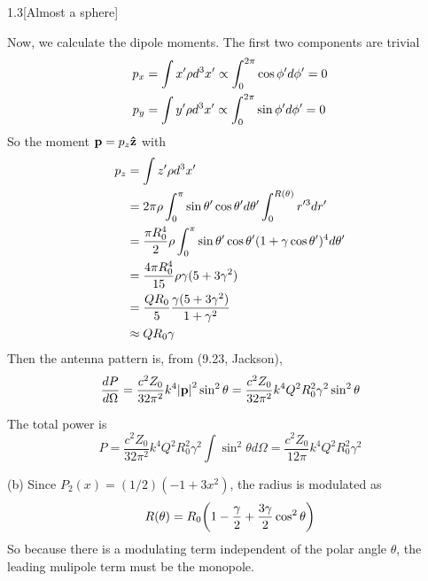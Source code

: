 \documentclass[12pt]{article}
\begin{document}
\begin{problem}{1.3}[Almost a sphere]
\begin{solution}
Now, we calculate the dipole moments. The first two components are trivial
\begin{align}
    p_x&=\int x'\rho d^3x'\propto\int_0^{2\pi}\cos\phi'd\phi'=0\notag\\
    p_y&=\int y'\rho d^3x'\propto\int_0^{2\pi}\sin\phi'd\phi'=0
\end{align}
So the moment $\vb{p}=p_z\vb{\hat{z}}$ with
\begin{align}
    p_z&=\int z'\rho d^3x'\notag\\
       &=2\pi\rho\int_0^\pi\sin\theta'\cos\theta'd\theta'
        \int_0^{R(\theta)}r'^3dr'\notag\\
       &=\frac{\pi
       R_0^4}{2}\rho\int_0^{\pi}\sin\theta'\cos\theta'(1+\gamma\cos\theta')^4d\theta'\notag\\
       &=\frac{4\pi R_0^4}{15}\rho\gamma(5+3\gamma^2)\notag\\
       &=\frac{QR_0}{5}\frac{\gamma(5+3\gamma^2)}{1+\gamma^2}\notag\\
       &\approx QR_0\gamma
\end{align}
Then the antenna pattern is, from (9.23, Jackson),
\begin{equation}
    \frac{dP}{d\Omega}=\frac{c^2Z_0}{32\pi^2}k^4\abs{\vb{p}}^2\sin^2\theta
    =\frac{c^2Z_0}{32\pi^2}k^4Q^2R_0^2\gamma^2\sin^2\theta
\end{equation}

The total power is
\begin{equation}
    P=\frac{c^2Z_0}{32\pi^2}k^4Q^2R_0^2\gamma^2\int\sin^2\theta d\Omega 
    =\frac{c^2Z_0}{12\pi}k^4Q^2R_0^2\gamma^2
\end{equation}

(b) Since $P_2(x)=(1/2)(-1+3x^2)$, the radius is modulated as
\begin{equation}
    R(\theta)=R_0\qty(1-\frac{\gamma}{2}+\frac{3\gamma}{2}\cos^2\theta) 
\end{equation}
So because there is a modulating term independent of the polar angle $\theta$,
the leading mulipole term must be the monopole.
\end{solution}
\end{problem}
\end{document}
